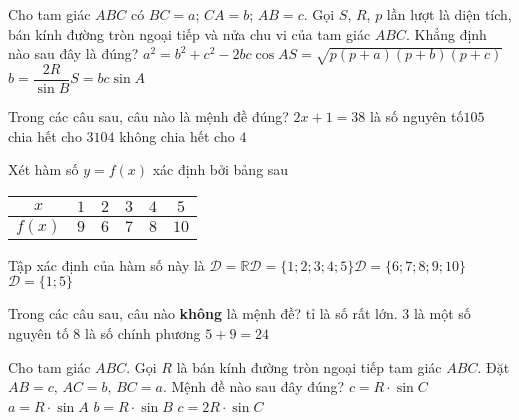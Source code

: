 \begin{ex}%
	Cho tam giác $A B C$ có $B C=a$; $C A=b$; $A B=c$. Gọi $S$, $R$, $p$ lần lượt là diện tích, bán kính đường tròn ngoại tiếp và nửa chu vi của tam giác $A B C$. Khẳng định nào sau đây là đúng?
	\choice
	{\True $a^2=b^2+c^2-2 b c \cos A$}{$S=\sqrt{p(p+a)(p+b)(p+c)}$}{$b=\dfrac{2 R}{\sin B}$}{$S=b c \sin A$}
\end{ex}

\begin{ex}%
	Trong các câu sau, câu nào là mệnh đề đúng?
	\choice
	{$2 x+1=3$}{$8$ là số nguyên tố}{\True $105$ chia hết cho $3$}{$104$ không chia hết cho $4$}
\end{ex}

\begin{ex}%
	Xét hàm số $y=f(x)$ xác định bởi bảng sau
	\begin{center}
		\renewcommand\arraystretch{1.8} %
		\begin{tabular}{|c|c|c|c|c|c|}
			\hline
			$x$&$1$&$2$&$3$&$4$&$5$ \\
			\hline
			$f(x)$&$9$&$6$&$7$&$8$&$10$\\
			\hline
		\end{tabular}
	\end{center}
	Tập xác định của hàm số này là
	\choice
	{$\mathscr{D}=\mathbb{R}$}{\True $\mathscr{D}=\{1 ; 2 ; 3 ; 4 ; 5\}$}{$\mathscr{D}=\{6 ; 7 ; 8 ; 9 ; 10\}$}{$\mathscr{D}=\{1 ; 5\}$}
\end{ex}
\begin{ex}%
	Trong các câu sau, câu nào \textbf{không} là mệnh đề?
	\choice
	{ tỉ là số rất lớn.}
	{3 là một số nguyên tố}
	{8 là số chính phương}
	{$5+9=24$}
	\loigiai{
		
	}
\end{ex}

\begin{ex}%
	Cho tam giác $A B C$. Gọi $R$ là bán kính đường tròn ngoại tiếp tam giác $A B C$. Đặt $A B=c,\, A C=b,\, B C=a$. Mệnh đề nào sau đây đúng?
	\choice
	{$c=R \cdot \sin C$}
	{$a=R \cdot \sin A$}
	{$b=R \cdot \sin B$}
	{\True $c=2 R \cdot \sin C$}
\end{ex}

